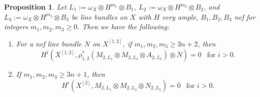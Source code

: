 \documentclass{amsart}
\theoremstyle{plain}
\newtheorem{prop}[thm]{Proposition}
\theoremstyle{definition}
\theoremstyle{remark}
\begin{document}
\begin{prop}\label{prop:mainvanishing2}
Let $L_1:=\omega_X \otimes H^{m_1} \otimes B_1$, $L_2:=\omega_X \otimes H^{m_2} \otimes B_2$, and $L_3:=\omega_X \otimes H^{m_3} \otimes B_3$ be line bundles on $X$ with $H$ very ample, $B_1, B_2, B_3$ nef for integers $m_1, m_2, m_3 \geq 0$. Then we have the following:
\begin{enumerate}
\item For a nef line bundle $N$ on $X^{[1,2]}$, if $m_1, m_2, m_3 \geq 3n+2$, then  
$$
H^i(X^{[1,2]}, \rho_{1,2}^* (M_{2,L_1} \otimes M_{2, L_2} \otimes A_{2, L_3}) \otimes N) = 0~~\text{ for $i>0$}. 
$$
\item If $m_1, m_2, m_3 \geq 3n+1$, then 
$$
H^i(X^{[2]}, M_{2,L_1} \otimes M_{2, L_2} \otimes N_{2, L_3}) = 0~~\text{ for $i>0$}. 
$$
\end{enumerate}
\end{prop}
\end{document}
